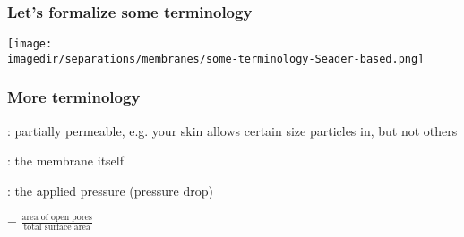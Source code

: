 \begin{frame}\frametitle{Let's formalize some terminology}
	
	\begin{center}
		\texttt{[image: \\imagedir/separations/membranes/some-terminology-Seader-based.png]}
	\end{center}
\end{frame}

\begin{frame}\frametitle{More terminology}
	
	{\color{myGreen}{semipermeable}}: partially permeable, e.g. your skin allows certain size particles in, but not others

	\vspace{12pt}
	{\color{myGreen}{mass separating agent}}: the membrane itself
	
	\vspace{12pt}	
	{\color{myGreen}{energy separating agent}}: the applied pressure (pressure drop)
	
	\vspace{12pt}
	{\color{myGreen}{porosity}} = $\displaystyle \frac{\text{area of open pores}}{\text{total surface area}}$ 
\end{frame}

